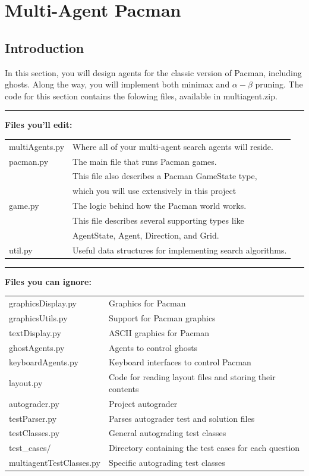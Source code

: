 \documentclass[a4paper, 11pt]{article}
\begin{document}
\section{Multi-Agent Pacman}
\subsection{Introduction}
In this section, you will design agents for the classic version of Pacman, including ghosts. Along the way, you will implement both minimax and $\alpha-\beta$ pruning. The code for this section contains the folowing files, available in \textsf{multiagent.zip}.

\rule{\textwidth}{0.5pt}

\textbf{Files you'll edit:}

\begin{tabular}{ll}
  \textsf{multiAgents.py} &	Where all of your multi-agent search agents will reside.\\
  \textsf{pacman.py} &	The main file that runs Pacman games.\\
  & This file also describes a Pacman GameState type,\\
                          & which you will use extensively in this project\\
  \textsf{game.py}	& The logic behind how the Pacman world works. \\
                          & This file describes several supporting types like\\
                          & AgentState, Agent, Direction, and Grid.\\
  \textsf{util.py} &	Useful data structures for implementing search algorithms.
\end{tabular}

\rule{\textwidth}{0.5pt}

\textbf{Files you can ignore:}

\begin{tabular}{ll}
  \textsf{graphicsDisplay.py} &	Graphics for Pacman\\
  \textsf{graphicsUtils.py}&	Support for Pacman graphics\\
  \textsf{textDisplay.py}&	ASCII graphics for Pacman\\
  \textsf{ghostAgents.py}&	Agents to control ghosts\\
  \textsf{keyboardAgents.py}&	Keyboard interfaces to control Pacman\\
  \textsf{layout.py}&	Code for reading layout files and storing their contents\\
  \textsf{autograder.py}&	Project autograder\\
  \textsf{testParser.py}&	Parses autograder test and solution files\\
  \textsf{testClasses.py}&	General autograding test classes\\
  \textsf{test\_cases/}&	Directory containing the test cases for each question\\
  \textsf{multiagentTestClasses.py}&	Specific autograding test classes
\end{tabular}
\end{document}
